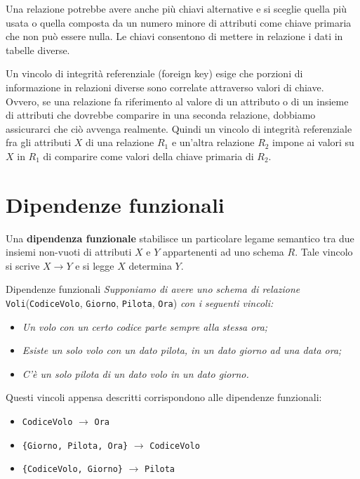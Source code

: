 Una relazione potrebbe avere anche più chiavi alternative e si sceglie quella più usata o quella composta da un numero minore di attributi come chiave primaria che non può essere nulla. Le chiavi consentono di mettere in relazione i dati in tabelle diverse.

Un vincolo di integrità referenziale (foreign key) esige che porzioni di informazione in relazioni diverse sono correlate attraverso valori di chiave. Ovvero, se una relazione fa riferimento al valore di un attributo o di un insieme di attributi che dovrebbe comparire in una seconda relazione, dobbiamo assicurarci che ciò avvenga realmente. Quindi un vincolo di integrità referenziale fra gli attributi
$X$ di una relazione $R_1$ e un'altra relazione $R_2$ impone ai valori su $X$ in $R_1$  di comparire come valori della chiave primaria di $R_2$.

\section{Dipendenze funzionali}
\begin{redbar}
    Una \textbf{dipendenza funzionale} stabilisce un particolare legame semantico tra due insiemi non-vuoti di attributi $X$ e $Y$ appartenenti ad uno schema $R$. Tale vincolo si scrive $X\to Y$ e si legge $X$ determina $Y$.    
\end{redbar}

\begin{Example}{Dipendenze funzionali}{}
    \textit{Supponiamo di avere uno schema di relazione} \verb|Voli|(\verb|CodiceVolo|, \verb|Giorno|, \verb|Pilota|, \verb|Ora|) \textit{con i seguenti vincoli:}
    \begin{itemize}
        \item[-] \textit{Un volo con un certo codice parte sempre alla stessa ora;}
        \item[-] \textit{Esiste un solo volo con un dato pilota, in un dato giorno ad una data ora;}
        \item[-] \textit{C'è un solo pilota di un dato volo in un dato giorno.}
    \end{itemize}
    Questi vincoli appensa descritti corrispondono alle dipendenze funzionali:
    \begin{itemize}
        \item[-] \verb|CodiceVolo| $\to$ \verb|Ora|
        \item[-] \verb|{Giorno, Pilota, Ora}| $\to$ \verb|CodiceVolo|
        \item[-] \verb|{CodiceVolo, Giorno}| $\to$ \verb|Pilota|
    \end{itemize}
\end{Example}

